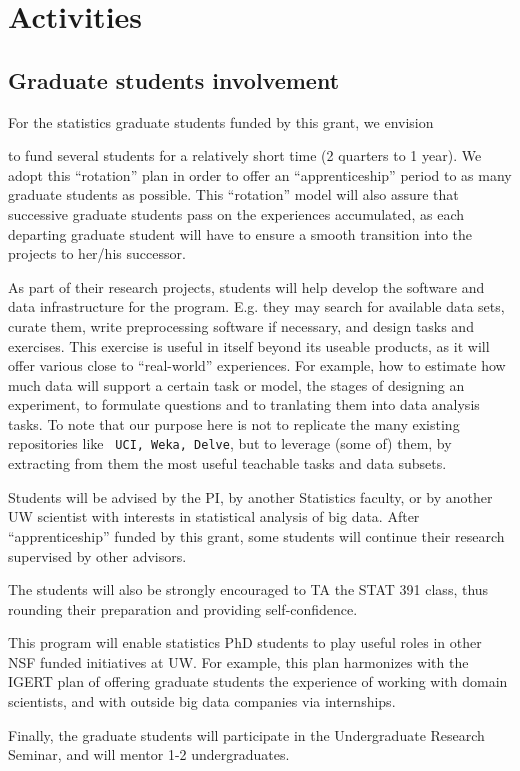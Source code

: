 \section{Activities}
\label{sec:activities}

\subsection{Graduate students involvement}
\label{sec:activities-grad}

For the statistics graduate students funded by this grant, we envision 
\bits
\item to fund several students for a relatively short time (2 quarters
  to 1 year). We adopt this ``rotation'' plan in order to offer an ``apprenticeship'' period to as many graduate students as possible. 
This ``rotation'' model will also assure that successive graduate students pass on the experiences accumulated, as each departing graduate student 
will have to ensure a smooth transition into the projects to her/his successor.
\item As part of their research projects, students will help develop
  the software and data infrastructure for the program. E.g. they may
  search for available data sets, curate them, write preprocessing
  software if necessary, and design tasks and exercises. This exercise
  is useful in itself beyond its useable products, as it will offer
  various close to ``real-world'' experiences. For example, how to
  estimate how much data will support a certain task or model, the
  stages of designing an experiment, to formulate questions and to
  tranlating them into data analysis tasks. To note that our purpose
  here is not to replicate the many existing repositories like {\tt
    UCI, Weka, Delve}, but to leverage (some of) them, by extracting
  from them the most useful teachable tasks and data subsets.
  
\item Students will be advised by the PI, by another Statistics faculty, or by another UW scientist with interests in statistical analysis of big data. After  ``apprenticeship'' funded by this grant, some students will continue their research supervised by other advisors. 
\item The students will also be strongly encouraged to TA the STAT 391 class, thus rounding their preparation and providing self-confidence. 
\item This program will enable statistics PhD students to play useful roles in other NSF funded initiatives at UW. For %
example, this plan harmonizes with the IGERT plan of offering graduate students the experience of working with domain scientists, and with outside big data companies via internships. 
\item Finally, the graduate students will participate in the Undergraduate Research Seminar, and will mentor 1-2 undergraduates. 
 \eits

